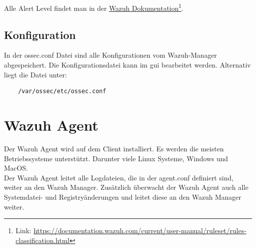 Alle Alert Level findet man in der \href{https://documentation.wazuh.com/current/user-manual/ruleset/rules-classification.html}{Wazuh Dokumentation}\footnote{Link: \href{https://documentation.wazuh.com/current/user-manual/ruleset/rules-classification.html}{https://documentation.wazuh.com/current/user-manual/ruleset/rules-classification.html}}.


\subsection{Konfiguration}
In der ossec.conf Datei sind alle Konfigurationen vom Wazuh-Manager abgespeichert.
Die Konfigurationsdatei kann im \acrshort{gui} bearbeitet werden. Alternativ liegt die Datei unter:
\begin{lstlisting}
    /var/ossec/etc/ossec.conf
\end{lstlisting}


\section{Wazuh Agent}
Der Wazuh Agent wird auf dem Client installiert.
Es werden die meisten Betriebssysteme unterstützt. Darunter viele Linux Systeme, Windows und MacOS.\\

Der Wazuh Agent leitet alle Logdateien, die in der agent.conf definiert sind, weiter an den Wazuh Manager.
Zusätzlich überwacht der Wazuh Agent auch alle Systemdatei- und Registryänderungen und leitet diese an den Wazuh Manager weiter. 
